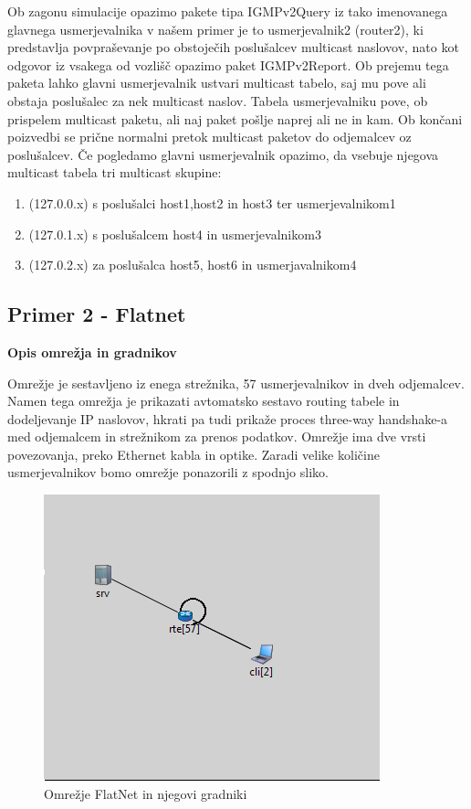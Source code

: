 \documentclass[a4paper,11pt]{article}
\begin{document}
\normalfont \normalsize 
\setlength{\parindent}{10pt}
Ob zagonu simulacije opazimo pakete tipa IGMPv2Query iz tako imenovanega glavnega usmerjevalnika v našem primer je to usmerjevalnik2 (router2), ki predstavlja povpraševanje po obstoječih poslušalcev multicast naslovov, nato kot odgovor iz vsakega od vozlišč opazimo paket IGMPv2Report. Ob prejemu tega paketa lahko glavni usmerjevalnik ustvari multicast tabelo, saj mu pove ali obstaja poslušalec za nek multicast naslov. Tabela usmerjevalniku pove, ob prispelem multicast paketu, ali naj paket pošlje naprej ali ne in kam. Ob končani poizvedbi se prične normalni pretok multicast paketov do odjemalcev oz poslušalcev. Če pogledamo glavni usmerjevalnik opazimo, da vsebuje njegova multicast tabela tri multicast skupine: 
\begin{enumerate}
	\item (127.0.0.x) s poslušalci host1,host2 in host3 ter usmerjevalnikom1
	\item (127.0.1.x) s poslušalcem host4 in usmerjevalnikom3
	\item (127.0.2.x) za poslušalca host5, host6 in usmerjavalnikom4
\end{enumerate} 
\subsection{Primer 2 - Flatnet}\par
\large \bf Opis omrežja in gradnikov\par
\normalfont \normalsize 
Omrežje je sestavljeno iz enega strežnika, 57 usmerjevalnikov in dveh odjemalcev. Namen tega omrežja je prikazati avtomatsko sestavo routing tabele in dodeljevanje IP naslovov, hkrati pa tudi prikaže proces three-way handshake-a med odjemalcem in strežnikom za prenos podatkov. Omrežje ima dve vrsti povezovanja, preko Ethernet kabla in optike. Zaradi velike količine usmerjevalnikov bomo omrežje ponazorili z spodnjo sliko.
\begin{figure}[h]
	\centering
	\includegraphics{FlatNet.png}
	\caption{Omrežje FlatNet in njegovi gradniki}
	\label{flatNet}	
\end{figure} 
\end{document}
